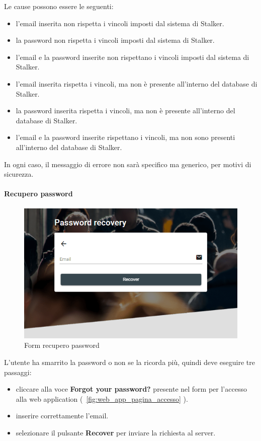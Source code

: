 \documentclass[../manuale-utente.tex]{subfiles}
\begin{document}
Le cause possono essere le seguenti:
\begin{itemize}
    \item l'email inserita non rispetta i vincoli imposti dal sistema di Stalker.
    \item la password non rispetta i vincoli imposti dal sistema di Stalker.
    \item l'email e la password inserite non rispettano i vincoli imposti dal sistema di Stalker.
    \item l'email inserita rispetta i vincoli, ma non è presente all'interno del database di Stalker.
    \item la password inserita rispetta i vincoli, ma non è presente all'interno del database di Stalker.
    \item l'email e la password inserite rispettano i vincoli, ma non sono presenti all'interno del database di Stalker.
\end{itemize}

In ogni caso, il messaggio di errore non sarà specifico ma generico, per motivi di sicurezza.
\newpage

\paragraph{Recupero password}%
\label{par:recupero_password}

\begin{figure}[H]
    \centering
    \includegraphics[width=150mm]{img/web-app/recupero-password.png}
    \caption{Form recupero password}%
    \label{fig:web_app_form_recupero_password}
\end{figure}

L'utente ha smarrito la password o non se la ricorda più, quindi deve eseguire tre passaggi:
\begin{itemize}
    \item cliccare alla voce \textbf{Forgot your password?} presente nel form per l'accesso alla web application (~\ref{fig:web_app_pagina_accesso} ).
    \item inserire correttamente l'email.
    \item selezionare il pulsante \textbf{Recover} per inviare la richiesta al server.
\end{itemize}
\end{document}
